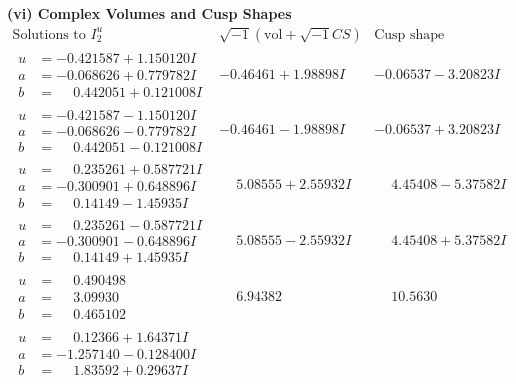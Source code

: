 \documentclass[1p]{elsarticle_modified}
\theoremstyle{definition}
\newcommand{\I}{\sqrt{-1}}
\begin{document}
\newpage\flushleft \textbf{(vi) Complex Volumes and Cusp Shapes}
$$\begin{array}{c|c|c}  
\text{Solutions to }I^u_{2}& \I (\text{vol} + \sqrt{-1}CS) & \text{Cusp shape}\\
 \hline 
\begin{aligned}
u &= -0.421587 + 1.150120 I \\
a &= -0.068626 + 0.779782 I \\
b &= \phantom{-}0.442051 + 0.121008 I\end{aligned}
 & -0.46461 + 1.98898 I & -0.06537 - 3.20823 I \\ \hline\begin{aligned}
u &= -0.421587 - 1.150120 I \\
a &= -0.068626 - 0.779782 I \\
b &= \phantom{-}0.442051 - 0.121008 I\end{aligned}
 & -0.46461 - 1.98898 I & -0.06537 + 3.20823 I \\ \hline\begin{aligned}
u &= \phantom{-}0.235261 + 0.587721 I \\
a &= -0.300901 + 0.648896 I \\
b &= \phantom{-}0.14149 - 1.45935 I\end{aligned}
 & \phantom{-}5.08555 + 2.55932 I & \phantom{-}4.45408 - 5.37582 I \\ \hline\begin{aligned}
u &= \phantom{-}0.235261 - 0.587721 I \\
a &= -0.300901 - 0.648896 I \\
b &= \phantom{-}0.14149 + 1.45935 I\end{aligned}
 & \phantom{-}5.08555 - 2.55932 I & \phantom{-}4.45408 + 5.37582 I \\ \hline\begin{aligned}
u &= \phantom{-}0.490498\phantom{ +0.000000I} \\
a &= \phantom{-}3.09930\phantom{ +0.000000I} \\
b &= \phantom{-}0.465102\phantom{ +0.000000I}\end{aligned}
 & \phantom{-}6.94382\phantom{ +0.000000I} & \phantom{-}10.5630\phantom{ +0.000000I} \\ \hline\begin{aligned}
u &= \phantom{-}0.12366 + 1.64371 I \\
a &= -1.257140 - 0.128400 I \\
b &= \phantom{-}1.83592 + 0.29637 I\end{aligned}

\end{array}$$
\end{document}
